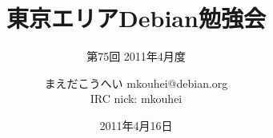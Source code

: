 




\documentclass[cjk,dvipdfmx,12pt]{beamer}
\usepackage{monthlypresentation}



\title{東京エリアDebian勉強会}
\subtitle{第75回 2011年4月度}
\author{まえだこうへい mkouhei@debian.org\\IRC nick: mkouhei}
\date{2011年4月16日}



